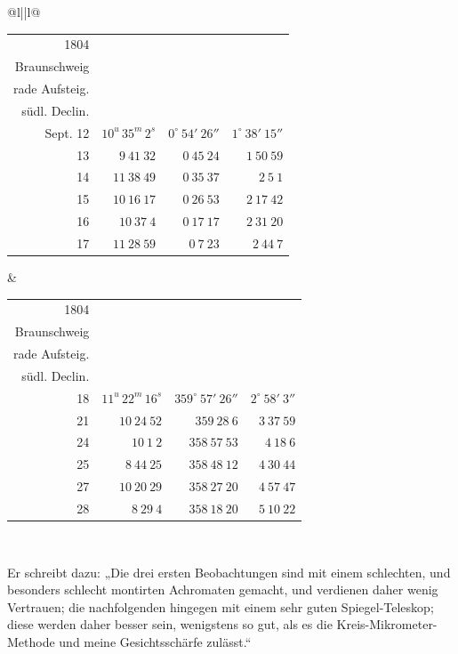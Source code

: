 \begin{center}
\begingroup\fontsize{8.0}{10.0}\selectfont\setlength{\tabcolsep}{1.35pt}\renewcommand{\arraystretch}{1.12}
\begin{tabular}{@{}l||l@{}}
\begin{tabular}{@{}r|r|r|r@{}}
1804 & \shortstack{Mittl. Zeit in\\Braunschweig} & \shortstack{Scheinbare ge-\\rade Aufsteig.} & \shortstack{Scheinbare\\südl. Declin.} \\ \hline
Sept. 12 & $10^{u}\,35^{m}\,2^{s}$ & $0^\circ\ 54'\ 26''$ & $1^\circ\ 38'\ 15''$ \\
13 & $9\ 41\ 32$ & $0\ 45\ 24$ & $1\ 50\ 59$ \\
14 & $11\ 38\ 49$ & $0\ 35\ 37$ & $2\ 5\ 1$ \\
15 & $10\ 16\ 17$ & $0\ 26\ 53$ & $2\ 17\ 42$ \\
16 & $10\ 37\ 4$ & $0\ 17\ 17$ & $2\ 31\ 20$ \\
17 & $11\ 28\ 59$ & $0\ 7\ 23$ & $2\ 44\ 7$ \\
\end{tabular} &
\begin{tabular}{@{}r|r|r|r@{}}
1804 & \shortstack{Mittl. Zeit in\\Braunschweig} & \shortstack{Scheinbare ge-\\rade Aufsteig.} & \shortstack{Scheinbare\\südl. Declin.} \\ \hline
18 & $11^{u}\,22^{m}\,16^{s}$ & $359^\circ\ 57'\ 26''$ & $2^\circ\ 58'\ 3''$ \\
21 & $10\ 24\ 52$ & $359\ 28\ 6$ & $3\ 37\ 59$ \\
24 & $10\ 1\ 2$ & $358\ 57\ 53$ & $4\ 18\ 6$ \\
25 & $8\ 44\ 25$ & $358\ 48\ 12$ & $4\ 30\ 44$ \\
27 & $10\ 20\ 29$ & $358\ 27\ 20$ & $4\ 57\ 47$ \\
28 & $8\ 29\ 4$ & $358\ 18\ 20$ & $5\ 10\ 22$ \\
\end{tabular}\\
\end{tabular}\endgroup
\end{center}

Er schreibt dazu: „Die drei ersten Beobachtungen sind mit einem schlechten, und
besonders schlecht montirten Achromaten gemacht, und verdienen daher wenig Vertrauen;
die nachfolgenden hingegen mit einem sehr guten Spiegel-Teleskop; diese werden daher
besser sein, wenigstens so gut, als es die Kreis-Mikrometer-Methode und meine
Gesichtsschärfe zulässt.“

